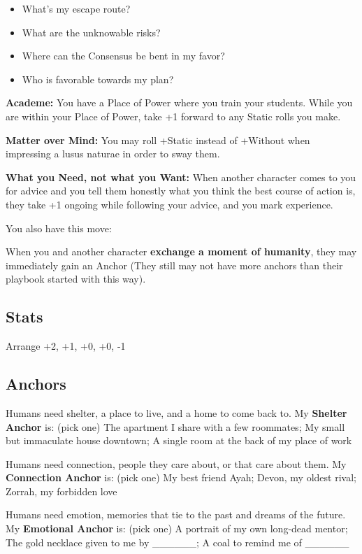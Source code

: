 \documentclass[
  oneside,
  statementpaper,
  9pt]{memoir}
\begin{document}
\begin{itemize}
\tightlist
\item
  What's my escape route?
\item
  What are the unknowable risks?
\item
  Where can the Consensus be bent in my favor?
\item
  Who is favorable towards my plan?
\end{itemize}

\textbf{Academe:} You have a Place of Power where you train your
students. While you are within your Place of Power, take +1 forward to
any Static rolls you make.

\textbf{Matter over Mind:} You may roll +Static instead of +Without when
impressing a lusus naturae in order to sway them.

\textbf{What you Need, not what you Want:} When another character comes
to you for advice and you tell them honestly what you think the best
course of action is, they take +1 ongoing while following your advice,
and you mark experience.

You also have this move:

When you and another character \textbf{exchange a moment of humanity},
they may immediately gain an Anchor (They still may not have more
anchors than their playbook started with this way).

\hypertarget{stats-5}{%
\subsection{Stats}\label{stats-5}}

Arrange +2, +1, +0, +0, -1

\hypertarget{anchors-5}{%
\subsection{Anchors}\label{anchors-5}}

Humans need shelter, a place to live, and a home to come back to. My
\textbf{Shelter Anchor} is: (pick one) The apartment I share with a few
roommates; My small but immaculate house downtown; A single room at the
back of my place of work

Humans need connection, people they care about, or that care about them.
My \textbf{Connection Anchor} is: (pick one) My best friend Ayah; Devon,
my oldest rival; Zorrah, my forbidden love

Humans need emotion, memories that tie to the past and dreams of the
future. My \textbf{Emotional Anchor} is: (pick one) A portrait of my own
long-dead mentor; The gold necklace given to me by \_\_\_\_\_\_; A coal
to remind me of \_\_\_\_\_\_
\end{document}
